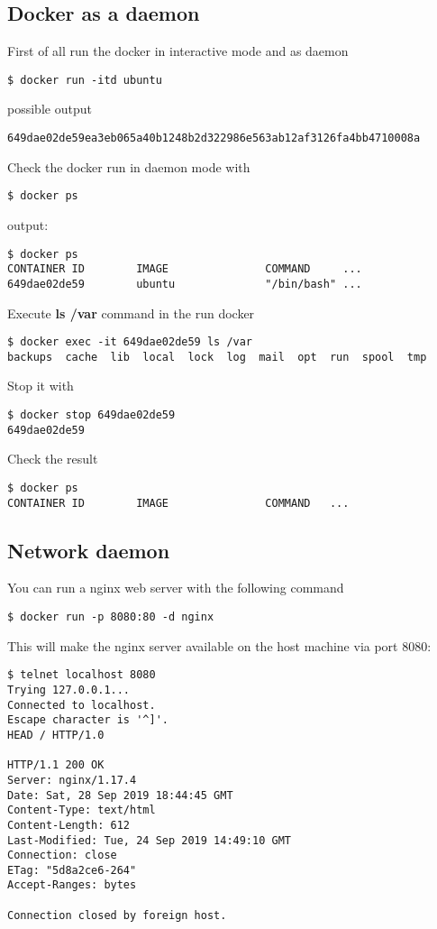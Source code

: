 \documentclass[14pt,a4paper]{article}
\begin{document}
\subsection{Docker as a daemon}
First of all run the docker in interactive mode and as daemon
\begin{verbatim}
$ docker run -itd ubuntu
\end{verbatim}
possible output
\begin{verbatim}
649dae02de59ea3eb065a40b1248b2d322986e563ab12af3126fa4bb4710008a
\end{verbatim}
Check the docker run in daemon mode with
\begin{verbatim}
$ docker ps
\end{verbatim}
output:
\begin{verbatim}
$ docker ps 
CONTAINER ID        IMAGE               COMMAND     ...
649dae02de59        ubuntu              "/bin/bash" ...
\end{verbatim}
Execute \textbf{ls /var} command in the run docker
\begin{verbatim}
$ docker exec -it 649dae02de59 ls /var
backups  cache  lib  local  lock  log  mail  opt  run  spool  tmp
\end{verbatim}
Stop it with
\begin{verbatim}
$ docker stop 649dae02de59
649dae02de59
\end{verbatim}
Check the result
\begin{verbatim}
$ docker ps
CONTAINER ID        IMAGE               COMMAND   ...
\end{verbatim}

\subsection{Network daemon}
You can run a nginx web server with the following command
\begin{verbatim}
$ docker run -p 8080:80 -d nginx
\end{verbatim}
This will make the nginx server available on the host machine via port
8080:
\begin{verbatim}
$ telnet localhost 8080
Trying 127.0.0.1...
Connected to localhost.
Escape character is '^]'.
HEAD / HTTP/1.0

HTTP/1.1 200 OK
Server: nginx/1.17.4
Date: Sat, 28 Sep 2019 18:44:45 GMT
Content-Type: text/html
Content-Length: 612
Last-Modified: Tue, 24 Sep 2019 14:49:10 GMT
Connection: close
ETag: "5d8a2ce6-264"
Accept-Ranges: bytes

Connection closed by foreign host.
\end{verbatim}
\end{document}
